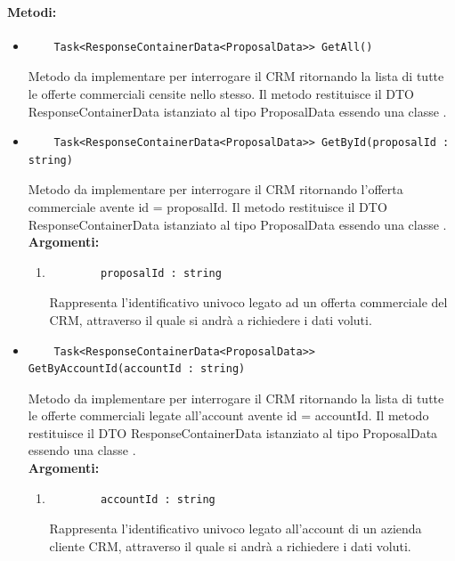 \paragraph{Metodi:}\hfill
\begin{itemize}
	\itemsep0em 
	\item 
	\begin{lstlisting}
	Task<ResponseContainerData<ProposalData>> GetAll()
	\end{lstlisting}
	Metodo da implementare per interrogare il CRM ritornando la lista di tutte le offerte commerciali censite nello stesso. Il metodo restituisce il DTO ResponseContainerData istanziato al tipo ProposalData essendo una classe .\\
	
	\item 
	\begin{lstlisting}
	Task<ResponseContainerData<ProposalData>> GetById(proposalId : string)
	\end{lstlisting}
	Metodo da implementare per interrogare il CRM ritornando l'offerta commerciale avente id = {proposalId}. Il metodo restituisce il DTO ResponseContainerData istanziato al tipo ProposalData essendo una classe .\\
	\textbf{\small Argomenti:}
	\begin{enumerate}[leftmargin=*]
		\itemsep0em 
		\item 
		\begin{lstlisting}
		proposalId : string
		\end{lstlisting}
		Rappresenta l'identificativo univoco legato ad un offerta commerciale del CRM, attraverso il quale si andrà a richiedere i dati voluti.
	\end{enumerate}
	
	\item 
	\begin{lstlisting}
	Task<ResponseContainerData<ProposalData>> GetByAccountId(accountId : string)
	\end{lstlisting}
	Metodo da implementare per interrogare il CRM ritornando la lista di tutte le offerte commerciali legate all'account avente id = {accountId}. Il metodo restituisce il DTO ResponseContainerData istanziato al tipo ProposalData essendo una classe .\\
	\textbf{\small Argomenti:}
	\begin{enumerate}[leftmargin=*]
		\itemsep0em
		\item 
		\begin{lstlisting}
		accountId : string
		\end{lstlisting}
		Rappresenta l'identificativo univoco legato all'account di un azienda cliente CRM, attraverso il quale si andrà a richiedere i dati voluti.
	\end{enumerate}
\end{itemize}

